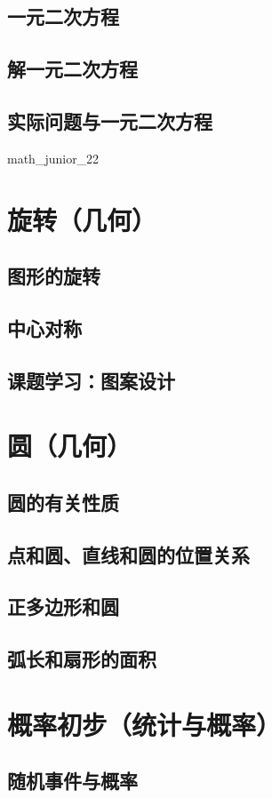 \documentclass[cn,blue,10pt]{elegantbook}
\begin{document}
\section{一元二次方程}
\section{解一元二次方程}
\section{实际问题与一元二次方程}
 {math_junior_22}
\chapter{旋转（几何）}
\section{图形的旋转}
\section{中心对称}
\section{课题学习：图案设计}
\chapter{圆（几何）}
\section{圆的有关性质}
\section{点和圆、直线和圆的位置关系}
\section{正多边形和圆}
\section{弧长和扇形的面积}
\chapter{概率初步（统计与概率）}
\section{随机事件与概率}
\end{document}
